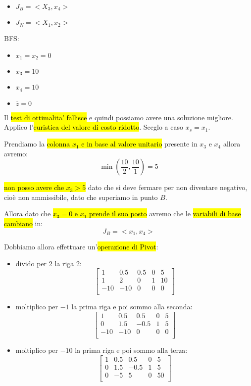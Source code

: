 \begin{itemize}
	\item $J_B = <X_3, x_4>$
	\item $J_N = <X_1, x_2>$
\end{itemize}

BFS:

\begin{itemize}
	\item $x_1 = x_2 = 0$
	\item $x_3 = 10$
	\item $x_4 = 10$
	\item $\overline{z} = 0$
\end{itemize}

Il \hl{test di ottimalita' fallisce} e quindi possiamo avere una soluzione migliore. Applico l'\hl{euristica del valore di costo ridotto}. Sceglo a caso $x_s = x_1$.

Prendiamo la \hl{colonna $x_1$ e in base al valore unitario} presente in $x_3$ e $x_4$ allora avremo:
$$\min (\frac{10}{2}, \frac{10}{1}) = 5$$

\hl{non posso avere che $x_3 > 5$} dato che si deve fermare per non diventare negativo, cioè non ammissibile, dato che superiamo in punto $B$.

Allora dato che \hl{$x_3 = 0$ e $x_1$ prende il suo posto} avremo che le \hl{variabili di base cambiano} in:
$$J_B = <x_1, x_4>$$

Dobbiamo allora effettuare un'\hl{operazione di Pivot}:

\begin{itemize}
	\item divido per $2$ la riga 2:
		$$
		\left[ {\begin{array}{ccccc}
			1 & 0.5 & 0.5 & 0 & 5\\
			1 & 2 & 0 & 1 & 10\\
			-10 & -10 & 0 & 0 & 0\\
		\end{array} } \right]
		$$

		\item moltiplico per $-1$ la prima riga e poi sommo alla seconda:
		$$
		\left[ {\begin{array}{ccccc}
			1 & 0.5 & 0.5 & 0 & 5\\
			0 & 1.5 & -0.5 & 1 & 5\\
			-10 & -10 & 0 & 0 & 0\\
		\end{array} } \right]
		$$

		\item moltiplico per $-10$ la prima riga e poi sommo alla terza:
		$$
		\left[ {\begin{array}{ccccc}
			1 & 0.5 & 0.5 & 0 & 5\\
			0 & 1.5 & -0.5 & 1 & 5\\
			0 & -5 & 5 & 0 & 50\\
		\end{array} } \right]
		$$
\end{itemize}

